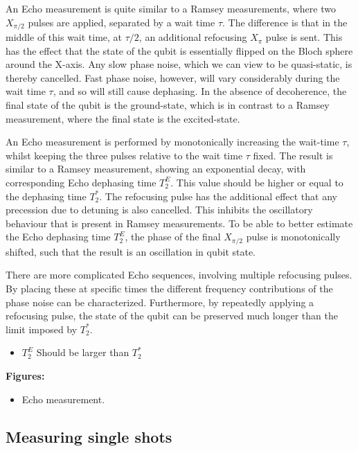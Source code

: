           An Echo measurement is quite similar to a Ramsey measurements, where two $X_{\pi/2}$ pulses are applied, separated by a wait time $\tau$. The difference is that in the middle of this wait time, at $\tau/2$, an additional refocusing $X_{\pi}$ pulse is sent. This has the effect that the state of the qubit is essentially flipped on the Bloch sphere around the X-axis. Any slow phase noise, which we can view to be quasi-static, is thereby cancelled. Fast phase noise, however, will vary considerably during the wait time $\tau$, and so will still cause dephasing. In the absence of decoherence, the final state of the qubit is the ground-state, which is in contrast to a Ramsey measurement, where the final state is the excited-state.

          An Echo measurement is performed by monotonically increasing the wait-time $\tau$, whilst keeping the three pulses relative to the wait time $\tau$ fixed. The result is similar to a Ramsey measurement, showing an exponential decay, with corresponding Echo dephasing time $T_2^E$. This value should be higher or equal to the dephasing time $T_2^*$. The refocusing pulse has the additional effect that any precession due to detuning is also cancelled. This inhibits the oscillatory behaviour that is present in Ramsey measurements. To be able to better estimate the Echo dephasing time $T_2^E$, the phase of the final $X_{\pi/2}$ pulse is monotonically shifted, such that the result is an oscillation in qubit state.

          There are more complicated Echo sequences, involving multiple refocusing pulses. By placing these at specific times the different frequency contributions of the phase noise can be characterized. Furthermore, by repeatedly applying a refocusing pulse, the state of the qubit can be preserved much longer than the limit imposed by $T_2^*$.


          \begin{itemize}
            \item $T_2^E$ Should be larger than $T_2^*$
          \end{itemize}

          \textbf{Figures:}
          \begin{itemize}
            \item Echo measurement.
          \end{itemize}

      \subsection{Measuring single shots}

